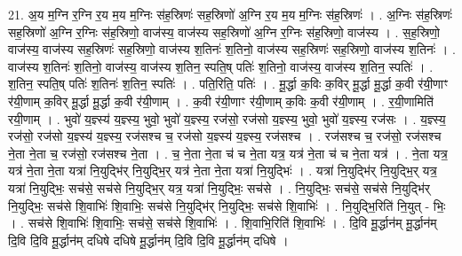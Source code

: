 \documentclass[17pt]{extarticle}
\begin{document}
21. अ॒य म॒ग्नि र॒ग्नि र॒य म॒य म॒ग्निः स॑ह॒स्रिणः॑ सह॒स्रिणो॑ अ॒ग्नि र॒य म॒य म॒ग्निः स॑ह॒स्रिणः॑ । . अ॒ग्निः स॑ह॒स्रिणः॑ सह॒स्रिणो॑ अ॒ग्नि र॒ग्निः स॑ह॒स्रिणो॒ वाज॑स्य॒ वाज॑स्य सह॒स्रिणो॑ अ॒ग्नि र॒ग्निः स॑ह॒स्रिणो॒ वाज॑स्य । . स॒ह॒स्रिणो॒ वाज॑स्य॒ वाज॑स्य सह॒स्रिणः॑ सह॒स्रिणो॒ वाज॑स्य श॒तिनः॑ श॒तिनो॒ वाज॑स्य सह॒स्रिणः॑ सह॒स्रिणो॒ वाज॑स्य श॒तिनः॑ । . वाज॑स्य श॒तिनः॑ श॒तिनो॒ वाज॑स्य॒ वाज॑स्य श॒तिन॒ स्पति॒ष् पतिः॑ श॒तिनो॒ वाज॑स्य॒ वाज॑स्य श॒तिन॒ स्पतिः॑ । . श॒तिन॒ स्पति॒ष् पतिः॑ श॒तिनः॑ श॒तिन॒ स्पतिः॑ । . पति॒रिति॒ पतिः॑ । . मू॒र्द्धा क॒विः क॒विर् मू॒र्द्धा मू॒र्द्धा क॒वी र॑यी॒णाꣳ र॑यी॒णाम् क॒विर् मू॒र्द्धा मू॒र्द्धा क॒वी र॑यी॒णाम् । . क॒वी र॑यी॒णाꣳ र॑यी॒णाम् क॒विः क॒वी र॑यी॒णाम् । . र॒यी॒णामिति॑ रयी॒णाम् । . भुवो॑ य॒ज्ञ्स्य॑ य॒ज्ञ्स्य॒ भुवो॒ भुवो॑ य॒ज्ञ्स्य॒ रज॑सो॒ रज॑सो य॒ज्ञ्स्य॒ भुवो॒ भुवो॑ य॒ज्ञ्स्य॒ रज॑सः । . य॒ज्ञ्स्य॒ रज॑सो॒ रज॑सो य॒ज्ञ्स्य॑ य॒ज्ञ्स्य॒ रज॑सश्च च॒ रज॑सो य॒ज्ञ्स्य॑ य॒ज्ञ्स्य॒ रज॑सश्च । . रज॑सश्च च॒ रज॑सो॒ रज॑सश्च ने॒ता ने॒ता च॒ रज॑सो॒ रज॑सश्च ने॒ता । . च॒ ने॒ता ने॒ता च॑ च ने॒ता यत्र॒ यत्र॑ ने॒ता च॑ च ने॒ता यत्र॑ । . ने॒ता यत्र॒ यत्र॑ ने॒ता ने॒ता यत्रा॑ नि॒युद्भि॑र् नि॒युद्भि॒र् यत्र॑ ने॒ता ने॒ता यत्रा॑ नि॒युद्भिः॑ । . यत्रा॑ नि॒युद्भि॑र् नि॒युद्भि॒र् यत्र॒ यत्रा॑ नि॒युद्भिः॒ सच॑से॒ सच॑से नि॒युद्भि॒र् यत्र॒ यत्रा॑ नि॒युद्भिः॒ सच॑से । . नि॒युद्भिः॒ सच॑से॒ सच॑से नि॒युद्भि॑र् नि॒युद्भिः॒ सच॑से शि॒वाभिः॑ शि॒वाभिः॒ सच॑से नि॒युद्भि॑र् नि॒युद्भिः॒ सच॑से शि॒वाभिः॑ । . नि॒युद्भि॒रिति॑ नि॒युत् - भिः॒ । . सच॑से शि॒वाभिः॑ शि॒वाभिः॒ सच॑से॒ सच॑से शि॒वाभिः॑ । . शि॒वाभि॒रिति॑ शि॒वाभिः॑ । . दि॒वि मू॒र्द्धान॑म् मू॒र्द्धान॑म् दि॒वि दि॒वि मू॒र्द्धान॑म् दधिषे दधिषे मू॒र्द्धान॑म् दि॒वि दि॒वि मू॒र्द्धान॑म् दधिषे । \newline
\end{document}
